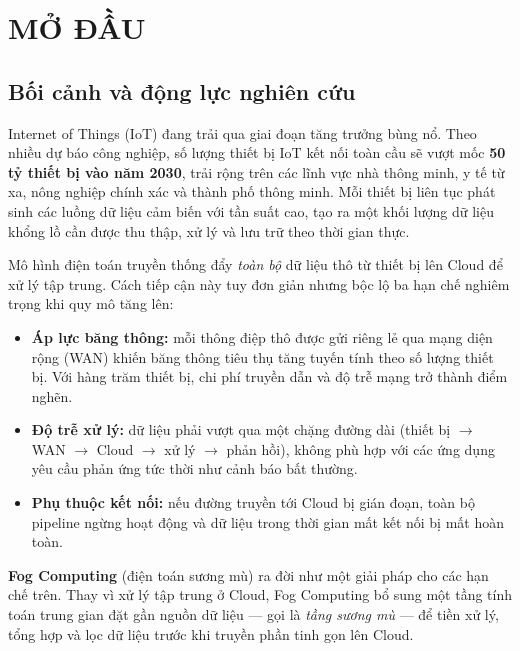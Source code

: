 \documentclass[13pt,a4paper]{report}
\begin{document}
\chapter{MỞ ĐẦU}
\label{ch:modau}

\section{Bối cảnh và động lực nghiên cứu}

Internet of Things (IoT) đang trải qua giai đoạn tăng trưởng bùng nổ. Theo nhiều
dự báo công nghiệp, số lượng thiết bị IoT kết nối toàn cầu sẽ vượt mốc
\textbf{50 tỷ thiết bị vào năm 2030}, trải rộng trên các lĩnh vực nhà thông minh,
y tế từ xa, nông nghiệp chính xác và thành phố thông minh. Mỗi thiết bị liên tục
phát sinh các luồng dữ liệu cảm biến với tần suất cao, tạo ra một khối lượng dữ
liệu khổng lồ cần được thu thập, xử lý và lưu trữ theo thời gian thực.

Mô hình điện toán truyền thống đẩy \textit{toàn bộ} dữ liệu thô từ thiết bị lên
Cloud để xử lý tập trung. Cách tiếp cận này tuy đơn giản nhưng bộc lộ ba hạn chế
nghiêm trọng khi quy mô tăng lên:

\begin{itemize}
  \item \textbf{Áp lực băng thông:} mỗi thông điệp thô được gửi riêng lẻ qua mạng
        diện rộng (WAN) khiến băng thông tiêu thụ tăng tuyến tính theo số lượng
        thiết bị. Với hàng trăm thiết bị, chi phí truyền dẫn và độ trễ mạng trở
        thành điểm nghẽn.
  \item \textbf{Độ trễ xử lý:} dữ liệu phải vượt qua một chặng đường dài
        (thiết bị $\to$ WAN $\to$ Cloud $\to$ xử lý $\to$ phản hồi), không phù hợp
        với các ứng dụng yêu cầu phản ứng tức thời như cảnh báo bất thường.
  \item \textbf{Phụ thuộc kết nối:} nếu đường truyền tới Cloud bị gián đoạn, toàn
        bộ pipeline ngừng hoạt động và dữ liệu trong thời gian mất kết nối bị mất
        hoàn toàn.
\end{itemize}

\textbf{Fog Computing} (điện toán sương mù) ra đời như một giải pháp cho các hạn
chế trên. Thay vì xử lý tập trung ở Cloud, Fog Computing bổ sung một tầng tính
toán trung gian đặt gần nguồn dữ liệu --- gọi là \textit{tầng sương mù} --- để
tiền xử lý, tổng hợp và lọc dữ liệu trước khi truyền phần tinh gọn lên Cloud.
\end{document}
